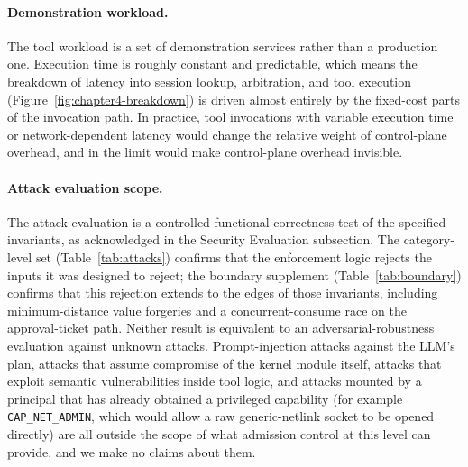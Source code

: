 \paragraph{Demonstration workload.} The tool workload is a set of demonstration services rather than a production one. Execution time is roughly constant and predictable, which means the breakdown of latency into session lookup, arbitration, and tool execution (Figure~\ref{fig:chapter4-breakdown}) is driven almost entirely by the fixed-cost parts of the invocation path. In practice, tool invocations with variable execution time or network-dependent latency would change the relative weight of control-plane overhead, and in the limit would make control-plane overhead invisible.

\paragraph{Attack evaluation scope.} The attack evaluation is a controlled functional-correctness test of the specified invariants, as acknowledged in the Security Evaluation subsection. The category-level set (Table~\ref{tab:attacks}) confirms that the enforcement logic rejects the inputs it was designed to reject; the boundary supplement (Table~\ref{tab:boundary}) confirms that this rejection extends to the edges of those invariants, including minimum-distance value forgeries and a concurrent-consume race on the approval-ticket path. Neither result is equivalent to an adversarial-robustness evaluation against unknown attacks. Prompt-injection attacks against the LLM's plan, attacks that assume compromise of the kernel module itself, attacks that exploit semantic vulnerabilities inside tool logic, and attacks mounted by a principal that has already obtained a privileged capability (for example \texttt{CAP\_NET\_ADMIN}, which would allow a raw generic-netlink socket to be opened directly) are all outside the scope of what admission control at this level can provide, and we make no claims about them.

